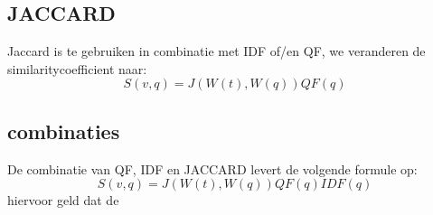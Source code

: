 \documentclass[a4paper]{article}
\begin{document}
\subsection{JACCARD}
Jaccard is te gebruiken in combinatie met IDF of/en QF, we veranderen de similaritycoefficient naar: 
\begin{equation}
S(v,q) = J(W(t), W(q)) QF(q)
\label{catattr}
\end{equation}
\subsection{combinaties}
De combinatie van QF, IDF en JACCARD levert de volgende formule op:
\begin{equation}
S(v,q) = J(W(t), W(q)) QF(q) IDF(q)
\label{catattr}
\end{equation}
hiervoor geld dat de 
\end{document}
